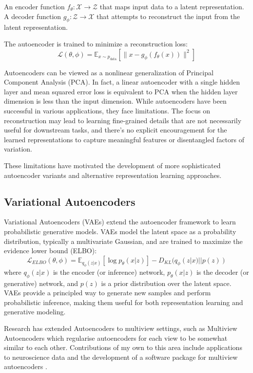 An encoder function $f_{\theta}: \mathcal{X} \to \mathcal{Z}$ that maps input data to a latent representation.
A decoder function $g_{\phi}: \mathcal{Z} \to \mathcal{X}$ that attempts to reconstruct the input from the latent representation.

The autoencoder is trained to minimize a reconstruction loss:
\begin{equation}
\mathcal{L}(\theta, \phi) = \mathbb{E}_{x \sim p_{\text{data}}}[\|x - g_{\phi}(f_{\theta}(x))\|^2]
\end{equation}

Autoencoders can be viewed as a nonlinear generalization of Principal Component Analysis (PCA). In fact, a linear autoencoder with a single hidden layer and mean squared error loss is equivalent to PCA when the hidden layer dimension is less than the input dimension.
While autoencoders have been successful in various applications, they face limitations. The focus on reconstruction may lead to learning fine-grained details that are not necessarily useful for downstream tasks, and there's no explicit encouragement for the learned representations to capture meaningful features or disentangled factors of variation.

These limitations have motivated the development of more sophisticated autoencoder variants and alternative representation learning approaches.
\subsection{Variational Autoencoders}
Variational Autoencoders (VAEs) \citep{kingma2013auto} extend the autoencoder framework to learn probabilistic generative models. VAEs model the latent space as a probability distribution, typically a multivariate Gaussian, and are trained to maximize the evidence lower bound (ELBO):
\begin{equation}
\mathcal{L}_{ELBO}(\theta, \phi) = \mathbb{E}_{q_{\phi}(z|x)}[\log p_{\theta}(x|z)] - D_{KL}(q_{\phi}(z|x) || p(z))
\end{equation}
where $q_{\phi}(z|x)$ is the encoder (or inference) network, $p_{\theta}(x|z)$ is the decoder (or generative) network, and $p(z)$ is a prior distribution over the latent space.
VAEs provide a principled way to generate new samples and perform probabilistic inference, making them useful for both representation learning and generative modeling.

Research has extended Autoencoders to multiview settings, such as Multiview Autoencoders \citep{ngiam2011multimodal} which regularise autoencoders for each view to be somewhat similar to each other. Contributions of my own to this area include applications to neuroscience data \citep{lawry2023multi} and the development of a software package for multiview autoencoders \citep{florence_townend_2023_10228564}. 

